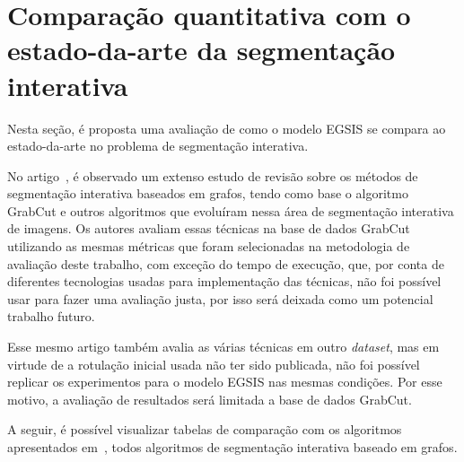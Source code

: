 \section{Comparação quantitativa com o estado-da-arte da segmentação interativa}\label{sec:comparacao-estado-da-arte}

Nesta seção, é proposta uma avaliação de como o modelo \gls{EGSIS} se
compara ao estado-da-arte no problema de segmentação interativa.

No artigo~, é observado um extenso estudo de
revisão sobre os métodos de segmentação interativa baseados em grafos,
tendo como base o algoritmo GrabCut e outros algoritmos que evoluíram
nessa área de segmentação interativa de imagens. Os autores avaliam
essas técnicas na base de dados GrabCut~\cite{rother2004grabcut}
utilizando as mesmas métricas que foram selecionadas na metodologia de
avaliação deste trabalho, com exceção do tempo de execução, que, por
conta de diferentes tecnologias usadas para implementação das
técnicas, não foi possível usar para fazer uma avaliação justa, por
isso será deixada como um potencial trabalho futuro.

Esse mesmo artigo também avalia as várias técnicas em outro
\textit{dataset}, mas em virtude de a rotulação inicial usada não ter
sido publicada, não foi possível replicar os experimentos para o
modelo \gls{EGSIS} nas mesmas condições. Por esse motivo, a avaliação
de resultados será limitada a base de dados GrabCut.

A seguir, é possível visualizar tabelas de comparação com os
algoritmos apresentados em~, todos
algoritmos de segmentação interativa baseado em grafos.


